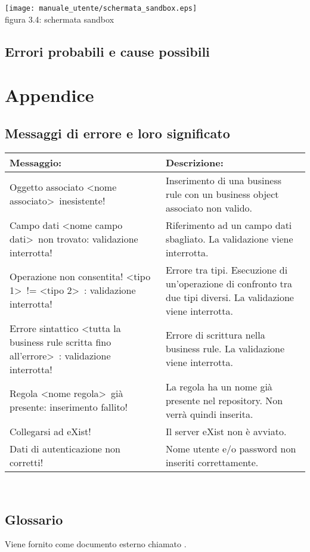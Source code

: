 \begin{center}
 \texttt{[image: manuale\_utente/schermata\_sandbox.eps]} \\
 figura 3.4: schermata sandbox
\end{center}


\section{Errori probabili e cause possibili}
\chapter{Appendice}
\section{Messaggi di errore e loro significato}
\begin{table}[htbp]
\begin{tabular}{||p{6.5cm}||p{6.5cm}||}
\hline
\textbf{Messaggio:} & \textbf{Descrizione:} \\ \hline
Oggetto associato \textless nome associato\textgreater\ inesistente! & Inserimento di una business rule con un business object associato non valido. \\ \hline
Campo dati \textless nome campo dati\textgreater\ non trovato: validazione interrotta! & Riferimento ad un campo dati sbagliato. La validazione viene interrotta. \\ \hline
Operazione non consentita! \textless tipo 1\textgreater\ != \textless tipo 2\textgreater\ : validazione interrotta! & Errore tra tipi. Esecuzione di un'operazione di confronto tra due tipi diversi. La validazione viene interrotta. \\ \hline
Errore sintattico \textless tutta la business rule scritta fino all'errore\textgreater\ : validazione interrotta! & Errore di scrittura nella business rule. La validazione viene interrotta. \\ \hline
Regola \textless nome regola\textgreater\  gi\`a presente: inserimento fallito! & La regola ha un nome gi\`a presente nel repository. Non verr\`a quindi inserita. \\ \hline
Collegarsi ad eXist! & Il server eXist non \`e avviato. \\ \hline
Dati di autenticazione non corretti! & Nome utente e/o password non inseriti correttamente. \\ \hline
\end{tabular} \\
\end{table}
\section{Glossario}
Viene fornito come documento esterno chiamato \Glossario.


